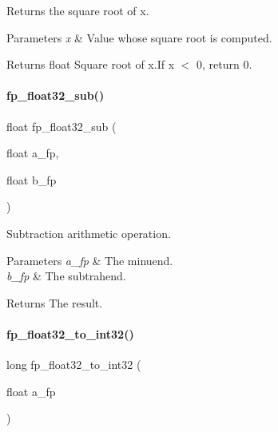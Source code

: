 Returns the square root of x. 


\begin{DoxyParams}{Parameters}
{\em x} & Value whose square root is computed. \\
\hline
\end{DoxyParams}
\begin{DoxyReturn}{Returns}
float Square root of x.\+If x $<$ 0, return 0. 
\end{DoxyReturn}
\mbox{\label{a00023_a131916cff95f607242ea6affe3e50382}} 
\paragraph{\texorpdfstring{fp\+\_\+float32\+\_\+sub()}{fp\_float32\_sub()}}
{\footnotesize\ttfamily float fp\+\_\+float32\+\_\+sub (\begin{DoxyParamCaption}\item[{float}]{a\+\_\+fp,  }\item[{float}]{b\+\_\+fp }\end{DoxyParamCaption})}



Subtraction arithmetic operation. 


\begin{DoxyParams}{Parameters}
{\em a\+\_\+fp} & The minuend. \\
\hline
{\em b\+\_\+fp} & The subtrahend. \\
\hline
\end{DoxyParams}
\begin{DoxyReturn}{Returns}
The result. 
\end{DoxyReturn}
\mbox{\label{a00023_aab3c64f665ae99d4f267aef56d96be03}} 
\paragraph{\texorpdfstring{fp\+\_\+float32\+\_\+to\+\_\+int32()}{fp\_float32\_to\_int32()}}
{\footnotesize\ttfamily long fp\+\_\+float32\+\_\+to\+\_\+int32 (\begin{DoxyParamCaption}\item[{float}]{a\+\_\+fp }\end{DoxyParamCaption})}



